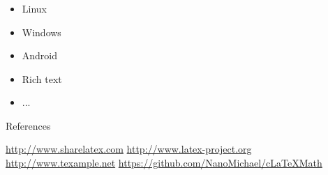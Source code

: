 \documentclass[10pt]{beamer}
\begin{document}
\begin{CJK*}{UTF8}{gbsn}
\begin{frame}
\frametitle{}
\begin{itemize}
    \item Linux\\
    \item Windows\\
    \item Android\\
    \item Rich text\\
    \item ...
\end{itemize}
\end{frame}






\begin{frame}{References}
\begin{thebibliography}{99}
        \url{http://www.sharelatex.com}
        \url{http://www.latex-project.org}
        \url{http://www.texample.net}
        \url{https://github.com/NanoMichael/cLaTeXMath}
\end{thebibliography}
\end{frame}

\begin{frame}
\Large
\begin{center}
\end{center}
\end{frame}
\end{CJK*}
\end{document}
